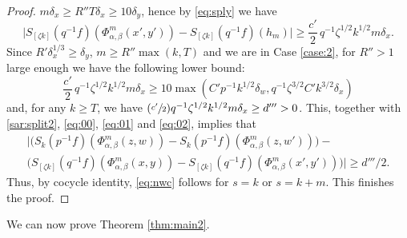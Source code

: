 \documentclass[10pt]{amsart}
\newcounter{case}
\newcommand{\Psfrac}[2]{(\sfrac{#1}{#2})}
\theoremstyle{definition}
\theoremstyle{plain}
\begin{document}
\begin{proof}
$m\delta_x \geq R'' T \delta_x \geq 10 \delta_y$, hence by \eqref{eq:sply} we have
\begin{equation}\label{eq:00}
\bigl|S_{[\zeta k]}(q^{-1}f)(\Phi_{\alpha,\beta}^m(x',y'))-S_{[\zeta k]}(q^{-1}f)(h_m)\bigr|\geq \frac{c'}{2}\,q^{-1}\zeta^{1/2}k^{1/2}m\delta_x.
\end{equation}
Since $R'\delta_x^{1/3} \geq \delta_y$, $m\geq R'' \max(k,T)$ and we are in Case \ref{case:2}, for $R''>1$ large enough we have
the following lower bound:
\[
\frac{c'}{2}\,q^{-1}\zeta^{1/2}k^{1/2}m\delta_x\geq 10\max(C'p^{-1}k^{1/2}\delta_w,q^{-1}\zeta^{3/2}C'k^{3/2}\delta_x)
\]
and, for any $k\geq T$, we have $\Psfrac{c'}{2}q^{-1}\zeta^{1/2}k^{1/2}m\delta_x\geq d'''>0$.
This, together with \eqref{sar:split2}, \eqref{eq:00}, \eqref{eq:01} and \eqref{eq:02}, implies that
\begin{multline*}
\bigl|\bigl(S_k(p^{-1}f)(\Phi_{\alpha,\beta}^m(z,w))-S_k(p^{-1}f)(\Phi_{\alpha,\beta}^m(z,w'))\bigr)-\\
\bigl(S_{[\zeta k]}(q^{-1}f)(\Phi_{\alpha,\beta}^m(x,y))-S_{[\zeta k]}(q^{-1}f)(\Phi_{\alpha,\beta}^m(x',y'))\bigr)\bigr|\geq d'''/2.
\end{multline*}
Thus, by cocycle identity, \eqref{eq:nwc} follows for $s=k$ or $s=k+m$.
This finishes the proof.
\end{proof}

We can now prove Theorem \ref{thm:main2}.
\end{document}
